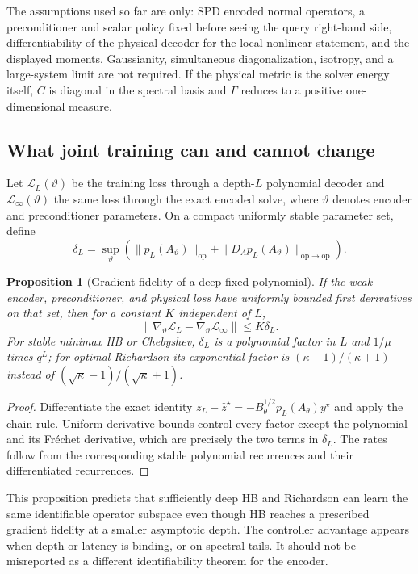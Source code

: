 \documentclass[11pt]{article}
\newtheorem{proposition}{Proposition}
\newcommand{\op}{\mathrm{op}}
\begin{document}
The assumptions used so far are only: SPD encoded normal operators, a
preconditioner and scalar policy fixed before seeing the query right-hand
side, differentiability of the physical decoder for the local nonlinear
statement, and the displayed moments.  Gaussianity, simultaneous
diagonalization, isotropy, and a large-system limit are not required.  If the
physical metric is the solver energy itself, $C$ is diagonal in the spectral
basis and $\Gamma$ reduces to a positive one-dimensional measure.

\subsection{What joint training can and cannot change}

Let $\mathcal L_L(\vartheta)$ be the training loss through a depth-$L$
polynomial decoder and $\mathcal L_\infty(\vartheta)$ the same loss through
the exact encoded solve, where $\vartheta$ denotes encoder and preconditioner
parameters.  On a compact uniformly stable parameter set, define
\[
 \delta_L=\sup_{\vartheta}\left(
 \|p_L(A_\vartheta)\|_{\op}
 +\|D_Ap_L(A_\vartheta)\|_{\op\to\op}\right).
\]

\begin{proposition}[Gradient fidelity of a deep fixed polynomial]
\label{prop:gradient-fidelity}
If the weak encoder, preconditioner, and physical loss have uniformly bounded
first derivatives on that set, then for a constant $K$ independent of $L$,
\[
 \|\nabla_\vartheta\mathcal L_L
 -\nabla_\vartheta\mathcal L_\infty\|
 \leq K\delta_L.
\]
For stable minimax HB or Chebyshev, $\delta_L$ is a polynomial factor in $L$
and $1/\mu$ times $q^L$; for optimal Richardson its exponential factor is
$(\kappa-1)/(\kappa+1)$ instead of
$(\sqrt\kappa-1)/(\sqrt\kappa+1)$.
\end{proposition}
\begin{proof}
Differentiate the exact identity
$z_L-\widehat z^\star=-B_\theta^{1/2}p_L(A_\theta)y^\star$ and apply the chain
rule.  Uniform derivative bounds control every factor except the polynomial
and its Fr\'echet derivative, which are precisely the two terms in
$\delta_L$.  The rates follow from the corresponding stable polynomial
recurrences and their differentiated recurrences.
\end{proof}

This proposition predicts that sufficiently deep HB and Richardson can learn
the same identifiable operator subspace even though HB reaches a prescribed
gradient fidelity at a smaller asymptotic depth.  The controller advantage
appears when depth or latency is binding, or on spectral tails.  It should not
be misreported as a different identifiability theorem for the encoder.
\end{document}
